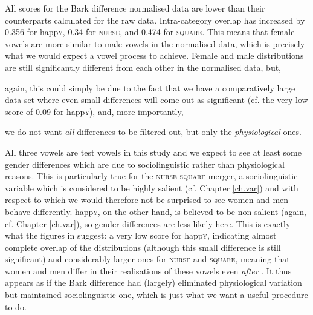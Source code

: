 All  scores for the Bark difference normalised data are lower than their counterparts calculated for the raw data.
Intra-category overlap has increased by 0.356 for happ\textsc{y}, 0.34 for \textsc{nurse}, and 0.474 for \textsc{square}.
This means that female vowels are more similar to male vowels in the normalised data, which is precisely what we would expect a vowel  process to achieve.
Female and male distributions are still significantly different from each other in the normalised data, but,
\begin{inparaenum}[(a)]
	\item again, this could simply be due to the fact that we have a comparatively large data set where even small differences will come out as significant (cf. the very low  score of 0.09 for happ\textsc{y}), and, more importantly,
	\item we do not want \emph{all} differences to be filtered out, but only the \emph{physiological} ones.
\end{inparaenum}

All three vowels are test vowels in this study and we expect to see at least some gender differences which are due to sociolinguistic rather than physiological reasons.
This is particularly true for the \textsc{nurse-square} merger, a sociolinguistic variable which is considered to be highly salient (cf. Chapter \ref{ch.var}) and with respect to which we would therefore not be surprised to see women and men behave differently.
happ\textsc{y}, on the other hand, is believed to be non-salient (again, cf. Chapter \ref{ch.var}), so gender differences are less likely here.
This is exactly what the figures in  suggest: a very low  score for happ\textsc{y}, indicating almost complete overlap of the distributions (although this small difference is still significant) and considerably larger ones for \textsc{nurse} and \textsc{square}, meaning that women and men differ in their realisations of these vowels even \emph{after} .
It thus appears as if the Bark difference  had (largely) eliminated physiological variation but maintained sociolinguistic one, which is just what we want a useful  procedure to do.

